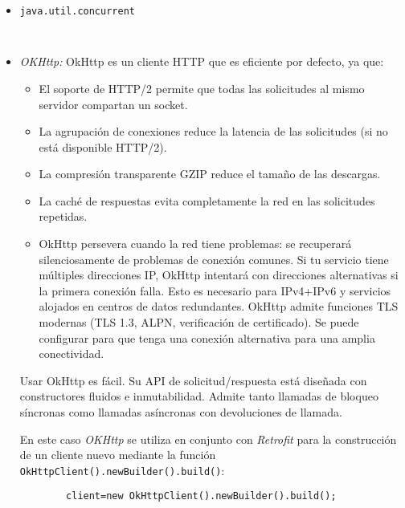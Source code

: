 \begin{itemize}
    \item \texttt{java.util.concurrent}
    \begin{lstlisting}
        
    \end{lstlisting}
    
    \item \textit{OKHttp: }
    OkHttp es un cliente HTTP que es eficiente por defecto, ya que:
    \begin{itemize}
        \item El soporte de HTTP/2 permite que todas las solicitudes al mismo
        servidor compartan un socket.
        \item La agrupación de conexiones reduce la latencia de las solicitudes
        (si no está disponible HTTP/2).
        \item La compresión transparente GZIP reduce el tamaño de las descargas.
        \item La caché de respuestas evita completamente la red en las
        solicitudes repetidas.
        \item OkHttp persevera cuando la red tiene problemas: se recuperará
        silenciosamente de problemas de conexión comunes. Si tu servicio tiene
        múltiples direcciones IP, OkHttp intentará con direcciones alternativas
        si la primera conexión falla. Esto es necesario para IPv4+IPv6 y
        servicios alojados en centros de datos redundantes. OkHttp admite
        funciones TLS modernas (TLS 1.3, ALPN, verificación de certificado). Se
        puede configurar para que tenga una conexión alternativa para una amplia
        conectividad.
    \end{itemize}
    Usar OkHttp es fácil. Su API de solicitud/respuesta está diseñada con
    constructores fluidos e inmutabilidad. Admite tanto llamadas de bloqueo
    síncronas como llamadas asíncronas con devoluciones de llamada.
    
    En este caso \textit{OKHttp} se utiliza en conjunto con \textit{Retrofit}
    para la construcción de un cliente nuevo mediante la función
    \texttt{OkHttpClient().newBuilder().build()}:
    \begin{lstlisting}
        client=new OkHttpClient().newBuilder().build();
    \end{lstlisting}
    

\end{itemize}
